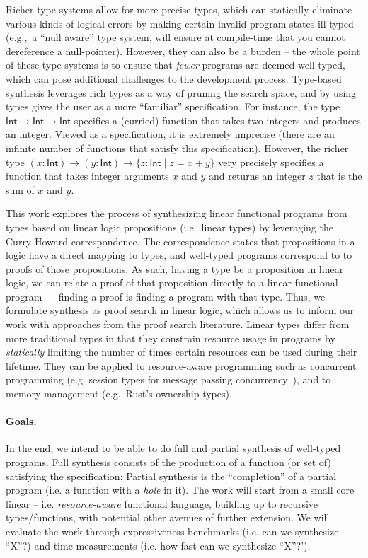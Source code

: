 \documentclass{llncs}
\newcommand{\mypara}[1]{\paragraph{\textbf{#1}.}}
\begin{document}
Richer type systems allow for more precise types, which can
statically eliminate various kinds of logical errors by making certain
invalid program states ill-typed (e.g.,~a ``null aware'' type system,
will ensure at compile-time that you cannot dereference a
null-pointer). However, they can also be a burden -- the whole point
of these type systems is to ensure that \emph{fewer} programs are
deemed well-typed, which can pose additional challenges to the
development process. Type-based synthesis leverages rich types as a
way of pruning the search space, and by using types gives the user as
a more ``familiar'' specification. For instance, the type
$\mathsf{Int} \rightarrow \mathsf{Int} \rightarrow \mathsf{Int}$
specifies a (curried) function that takes two integers and produces an
integer. Viewed as a specification, it is extremely imprecise (there
are an infinite number of functions that satisfy this specification).
However, the richer type $(x{:}\mathsf{Int}) \rightarrow
(y{:}\mathsf{Int}) \rightarrow \{z{:}\mathsf{Int} \mid z = x+y\}$
very precisely specifies a function that takes integer arguments $x$
and $y$ and returns an integer $z$ that is the sum of $x$ and $y$. 


%
This work explores the process of synthesizing linear functional
programs from types based on linear logic propositions (i.e.~linear
types) by leveraging the Curry-Howard correspondence.  The
correspondence states that propositions in a logic have a direct
mapping to types, and well-typed programs correspond to to proofs of
those propositions.  As such, having a type be a proposition in linear
logic, we can relate a proof of that proposition directly to a linear
functional program — finding a proof is finding a program with that
type. Thus, we formulate synthesis as proof search in linear logic,
which allows us to inform our work with approaches from the proof
search literature.  Linear types differ from more traditional types in
that they constrain resource usage in programs by \emph{statically}
limiting the number of times certain resources can be used during
their lifetime.  They can be applied to resource-aware programming
such as concurrent programming (e.g. session types for message passing
concurrency~\cite{}), and to memory-management (e.g.~Rust's ownership
types).

\mypara{Goals}
In the end, we intend to be able to do full and partial synthesis of
well-typed programs. Full synthesis consists of the production of a
function (or set of) satisfying the specification; Partial synthesis
is the ``completion'' of a partial program (i.e. a function with a
\emph{hole} in it). The work will start from a small core linear --
i.e. \emph{resource-aware} functional language, building up to
recursive types/functions, with potential other avenues of further
extension. 
%
We will evaluate the work through
expressiveness benchmarks (i.e. can we synthesize ``X''?) and time
measurements (i.e. how fast can we synthesize ``X''?').
\end{document}
